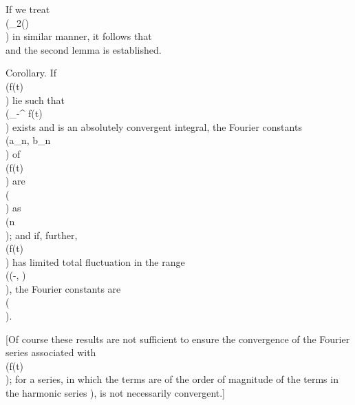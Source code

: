 If we treat \\(\chi_{2}(\theta)\\) in similar manner, it follows that
\\[ \begin{align*}
  \left| \, 
    \int_{a}^{b}\! \psi (\theta) \sin(\lambda \theta) \, d \theta
   \, \right| 
  &
  \leq
  \left| \, 
    \int_{a}^{b}\! \chi_{1}(\theta) \sin(\lambda\theta) \, d \theta
   \, \right| 
  +
  \left| \, 
    \int_{a}^{b}\! \chi_{2}(\theta) \sin(\lambda\theta) \, d \theta
   \, \right| 
  \\
  &
  \leq
  2 \left\{ \chi_{1}(b) + \chi_{2}(b) \right\} / \lambda
  \\
  = &
  \bigO(1 / \lambda),
\end{align*} \\]
and the second lemma is established.

Corollary. If \\(f(t)\\) lie such that \\(\int_{-\pi}^{\pi} f(t)\\) %
exists and is an absolutely convergent integral,
the Fourier constants \\(a_{n}, b_{n}\\) of \\(f(t)\\) are \\(\\) as
\\(n \rightarrow \infty\\);
and if, further, \\(f(t)\\) has limited total fluctuation in the range
\\((-\pi, \pi)\\), the Fourier constants are \\(\\).

[Of course these results are not sufficient to ensure the convergence
of the Fourier series associated with \\(f(t)\\); for a series, in which the
terms are of the order of magnitude of the terms in the harmonic
series ), is not necessarily convergent.]

%
%


